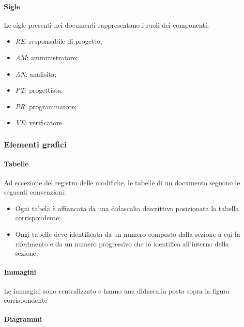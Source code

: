 \paragraph{Sigle}
Le sigle presenti nei documenti rappresentano i ruoli dei componenti:
\begin{itemize}

	\item \textit{RE}: responsabile di progetto;
	
	\item \textit{AM}: amministratore;
	
	\item \textit{AN}: analisita;
	
	\item \textit{PT}: progettista;
	
	\item \textit{PR}: programmatore;
	
	\item \textit{VE}: verificatore.

\end{itemize}

\subsubsection{Elementi grafici}
\paragraph{Tabelle}
Ad eccezione del registro delle modifiche, le tabelle di un documento seguono le seguenti convenzioni:
\begin{itemize}

	\item Ogni tabela è affiancata da una didascalia descrittiva posizionata la tabella corrispondente;
	
	\item Ongi tabelle deve identificata da un numero composto dalla sezione a cui fa riferimento e da un numero progressivo che lo identifica all'interno della sezione;

\end{itemize}
\paragraph{Immagini}

Le immagini sono centralizzato e hanno una didascalia posta sopra la figura corrispondente

\paragraph{Diagrammi}

